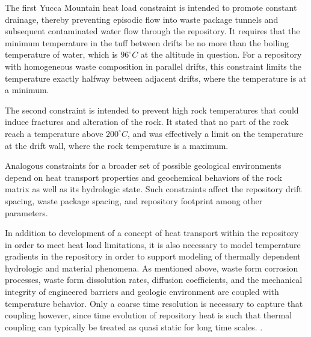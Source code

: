 The first Yucca Mountain heat load constraint is intended to promote constant 
drainage, thereby preventing episodic flow into waste package tunnels and
subsequent contaminated water flow through the repository. It requires that the 
minimum temperature in the tuff between drifts be no  more than the boiling 
temperature of water, which is $96^{\circ}C$ at the altitude in question. For a 
repository with homogeneous waste composition in parallel drifts, this constraint 
limits the temperature exactly halfway between adjacent drifts, where the 
temperature is at a minimum.

The second constraint is intended to prevent high rock temperatures that could 
induce fractures and alteration of the rock. It stated that no part 
of the rock reach a temperature above $200^{\circ}C$, and was effectively a 
limit on the temperature at the drift wall, where the rock temperature is a 
maximum.  

Analogous constraints for a broader set of possible geological environments 
depend on heat transport properties and geochemical behaviors of the rock matrix 
as well as its hydrologic state.  Such constraints affect the  
repository drift spacing, waste package spacing, and repository footprint among 
other parameters. 


In addition to development of a concept of heat transport within the repository 
in order to meet heat load limitations, it is also necessary to model 
temperature gradients in the repository in  order to support modeling of 
thermally dependent hydrologic and material phenomena.  As mentioned above, 
waste form corrosion processes, waste form
dissolution rates, diffusion coefficients, and the mechanical integrity of 
engineered barriers and geologic environment are coupled with temperature 
behavior. 
Only a coarse time resolution is necessary to capture that coupling 
however, since time evolution of repository heat is
such that thermal coupling can typically be treated as quasi static for long 
time scales.
\cite{andra_argile:_2005}. %

